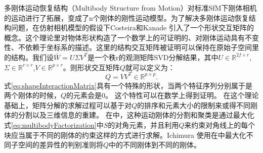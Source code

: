 多刚体运动恢复结构（Multibody Structure from Motion）对标准SfM下刚体相机的运动进行了拓展，变成了n个刚体的刚性运动模型。为了解决多刚体运动恢复结构问题，在仿射相机模型的假设下Costeira和Kanade\cite{Costeira1998A} 引入了一个形状交互矩阵的概念。这个理论里对物体形状构造了一个数学上的可证明的、对刚体运动具有不变性、不依赖于坐标系的描述。这里的结构交互矩阵被证明可以保持在原始子空间里的结构。我们设$\bar{W}=U\Sigma V^T$是一个秩r的观测矩阵SVD分解结果，其中$U\in \mathbb{R}^{2f\times r}$, $\Sigma\in \mathbb{R}^{r\times r}$,$V\in \mathbb{R}^{p\times r}$。则形状交互矩阵$Q$就可以定义为：
\begin{equation}\label{eq:shapeInteractionMatrix}
Q=VV^T\in \mathbb{R}^{p\times p}.
\end{equation}
式\eqref{eq:shapeInteractionMatrix}具有一个特殊的形状，当两个特征序列分别属于是两个刚体的时候，$Q$的元素会是0。 这个特性可以在数学上得到证明\cite{Kanatani2001Motion}。 在这个理论基础上，矩阵分解的求解过程可以基于对$Q$的排序和元素大小的限制来或得不同刚体的分割以及三维信息的重建。
在\cite{Costeira1998A}中，这种运动刚体的分割和聚类是通过最大化式\eqref{eq:multibodyFactorization}中$S$的对角元素，并且利用$Q$来约束对角线上的每个块应当属于不同的刚体的约束这样的方式进行求解。Ichimura\cite{Ichimura1999Motion} 使用在\cite{Ostu2007A}中最大化不同子空间的差异性的判别准则将$Q$中的不同刚体到不同的刚体。
